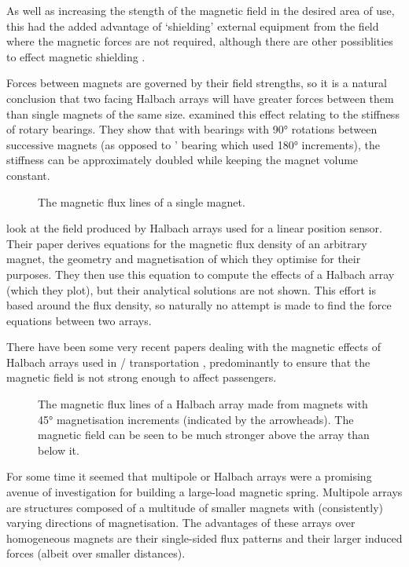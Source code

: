 As well as increasing the stength of the magnetic field in the desired area of use, this had the added advantage of `shielding' external equipment from the field where the magnetic forces are not required, although there are other possiblities to effect magnetic shielding \cite{becherini2009}.

\textcite{choi2008}

Forces between magnets are governed by their field strengths, so
it is a natural conclusion that two facing Halbach arrays will
have greater forces between them than single magnets of the same
size. \textcite{yonnet1991} examined this effect relating to the
stiffness of rotary bearings. They show that with bearings with
\ang{90} rotations between successive magnets (as opposed to
\citeauthor{backers1961}' %
bearing which used \ang{180}
increments), the stiffness can be approximately doubled while
keeping the magnet volume constant.

\begin{figure}
\caption{The magnetic flux lines of a single magnet.}
\end{figure}

\textcite{bancel1998} look at the field produced by Halbach
arrays used for a linear position sensor. Their paper derives
equations for the magnetic flux density of an arbitrary magnet,
the geometry and magnetisation of which they optimise for their
purposes. They then use this equation to compute the effects of
a Halbach array (which they plot), but their analytical
solutions are not shown. This effort is based around the flux
density, so naturally no attempt is made to find the force
equations between two arrays.

There have been some very recent papers dealing with the
magnetic effects of Halbach arrays used in \maglev/
transportation \cite{hoburg2004}, predominantly to ensure
that the magnetic field is not strong enough to affect
passengers.

\begin{figure}
\caption[Magnetic flux lines of a Halbach array.]{%
  The magnetic flux lines of a Halbach array made from magnets with \ang{45} 
  magnetisation increments (indicated by the arrowheads). The magnetic field 
  can be seen to be much stronger above the array than below it.}
\end{figure}

For some time it seemed that multipole or Halbach arrays were a
promising avenue of investigation for building a large-load magnetic
spring. Multipole arrays are structures composed of a multitude of
smaller magnets with (consistently) varying directions of
magnetisation. The advantages of these arrays over homogeneous magnets
are their single-sided flux patterns and their larger induced forces
(albeit over smaller distances).

